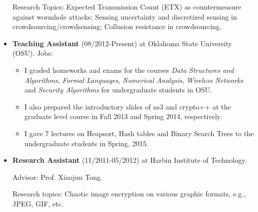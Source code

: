 \documentclass{article}
\begin{document}
\begin{itemize}
Research Topics: Expected Transmission Count (ETX) as countermeasure against wormhole attacks; Sensing uncertainty and discretized sensing in crowdsourcing/crowdsensing; Collusion resistance in crowdsourcing.
%
%
\item {\bf Teaching Assistant} (08/2012-Present) at Oklahoma State University (OSU).
Jobs: 
	\begin{itemize}
	\item I graded homeworks and exams for the courses {\it Data Structures and Algorithms}, {\it Formal Languages}, {\it Numerical Analysis}, {\it Wireless Networks} and {\it Security Algorithms} for undergraduate students in OSU. 
	\item I also prepared the introductory slides of ns3 and crypto++ at the graduate level course in Fall 2013 and Spring 2014, respectively.
	\item I gave 7 lectures on Heapsort, Hash tables and Binary Search Trees to the undergraduate students in Spring, 2015.
	\end{itemize}

\item {\bf Research Assistant} (11/2011-05/2012) at Harbin Institute of Technology.

Advisor: Prof. Xiaojun Tong.

Research topics: Chaotic image encryption on various graphic formats, e.g., JPEG, GIF, etc.
\end{itemize}
\end{document}

